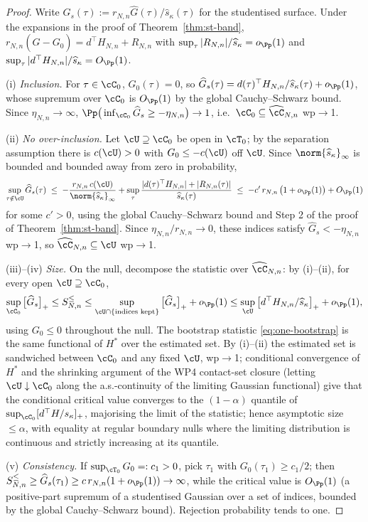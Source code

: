 \closuredraft
\begin{proof}
Write $\widehat G_s(\tau):=r_{N,n}\widehat G(\tau)/\widehat s_\kappa(\tau)$
for the studentised surface. Under the expansions in the proof of Theorem~\ref{thm:st-band},
$r_{N,n}(\widehat G-G_0)=d^\top H_{N,n}+R_{N,n}$ with
$\sup_\tau|R_{N,n}|/\widehat s_\kappa=o_{\Pp}(1)$ and
$\sup_\tau|d^\top H_{N,n}|/\widehat s_\kappa=O_{\Pp}(1)$.

(i) \emph{Inclusion.} For $\tau\in\cC_0$, $G_0(\tau)=0$, so
$\widehat G_s(\tau)=d(\tau)^\top H_{N,n}/\widehat s_\kappa(\tau)
+o_{\Pp}(1)$, whose supremum over $\cC_0$ is $O_{\Pp}(1)$ by the global
Cauchy--Schwarz bound. Since $\eta_{N,n}\to\infty$,
$\Pp\big(\inf_{\cC_0}\widehat G_s\ge-\eta_{N,n}\big)\to1$, i.e.\
$\cC_0\subseteq\widehat\cC_{N,n}$ wp$\to$1.

(ii) \emph{No over-inclusion.} Let $\cU\supseteq\cC_0$ be open in $\cT_0$;
by the separation assumption there is $c(\cU)>0$ with
$G_0\le-c(\cU)$ off $\cU$. Since $\norm{\widehat s_\kappa}_\infty$ is
bounded and bounded away from zero in probability,
\[
 \sup_{\tau\notin\cU}\widehat G_s(\tau)
 \;\le\;-\frac{r_{N,n}\,c(\cU)}{\norm{\widehat s_\kappa}_\infty}
 +\sup_\tau\frac{|d(\tau)^\top H_{N,n}|+|R_{N,n}(\tau)|}
 {\widehat s_\kappa(\tau)}
 \;\le\;-c'\,r_{N,n}\,\big(1+o_{\Pp}(1)\big)+O_{\Pp}(1)
\]
for some $c'>0$, using the global Cauchy--Schwarz bound and Step 2 of the proof of
Theorem~\ref{thm:st-band}. Since $\eta_{N,n}/r_{N,n}\to0$, these indices satisfy
$\widehat G_s<-\eta_{N,n}$ wp$\to$1, so
$\widehat\cC_{N,n}\subseteq\cU$ wp$\to$1.

(iii)--(iv) \emph{Size.} On the null, decompose the statistic over
$\widehat\cC_{N,n}$: by (i)--(ii), for every open $\cU\supseteq\cC_0$,
\[
 \sup_{\cC_0}\big[\widehat G_s\big]_+\le
 S^\le_{N,n}\le\sup_{\cU\cap\{\text{indices kept}\}}\big[\widehat
 G_s\big]_+ +o_{\Pp}(1)
 \le\sup_{\cU}\big[d^\top H_{N,n}/\widehat s_\kappa\big]_+ +o_{\Pp}(1),
\]
using $G_0\le0$ throughout the null. The bootstrap statistic
\eqref{eq:one-bootstrap} is the same functional of $H^*$ over the estimated
set. By (i)--(ii) the estimated set is sandwiched between $\cC_0$ and any
fixed $\cU$, wp$\to$1; conditional convergence of $H^*$ and the shrinking
argument of the WP4 contact-set closure (letting $\cU\downarrow\cC_0$ along
the a.s.-continuity of the limiting Gaussian functional) give that the
conditional critical value converges to the $(1-\alpha)$ quantile of
$\sup_{\cC_0}[d^\top H/s_\kappa]_+$, majorising the limit of the statistic;
hence asymptotic size $\le\alpha$, with equality at regular boundary nulls
where the limiting distribution is continuous and strictly increasing at its
quantile.

(v) \emph{Consistency.} If $\sup_{\cT_0}G_0=:c_1>0$, pick $\tau_1$ with
$G_0(\tau_1)\ge c_1/2$; then
$S^\le_{N,n}\ge\widehat G_s(\tau_1)
\ge c\,r_{N,n}(1+o_{\Pp}(1))\to\infty$, while the critical value is
$O_{\Pp}(1)$ (a positive-part supremum of a studentised Gaussian over a set
of indices, bounded by the global Cauchy--Schwarz bound). Rejection
probability tends to one.
\end{proof}
